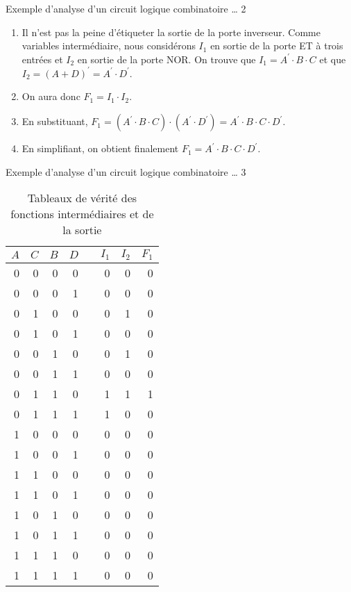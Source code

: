 \documentclass[presentation]{beamer}
\begin{document}
\begin{frame}[label={sec:orgcb3e790}]{Exemple d'analyse d'un circuit logique combinatoire \ldots{} 2}
\begin{enumerate}
\item Il n'est pas la peine d'étiqueter la sortie de la porte
inverseur. Comme variables intermédiaire, nous considérons \(I_1\)
en sortie de la porte ET à trois entrées et \(I_2\) en sortie de la
porte NOR. On trouve que \(I_1 = A^\prime \cdot B \cdot C\) et que
\(I_2 = (A + D)^\prime = A^\prime \cdot D^\prime\).

\item On aura donc \(F_1 = I_1 \cdot I_2\).

\item En substituant, \(F_1 = ( A^\prime \cdot B \cdot C ) \cdot (
   A^\prime \cdot D^\prime) = A^\prime \cdot B \cdot C \cdot
   D^\prime\).

\item En simplifiant, on obtient finalement \(F_1 = A^\prime \cdot B
   \cdot C \cdot D^\prime\).
\end{enumerate}
\end{frame}

\begin{frame}[label={sec:org0cb1112}]{Exemple d'analyse d'un circuit logique combinatoire \ldots{} 3}
\begin{table}[h] \scriptsize
\caption{\label{tab:orge8d8e42}Tableaux de vérité des fonctions intermédiaires et de la sortie}
\centering
\begin{tabular}{rrrrlrrr}
\(A\) & \(C\) & \(B\) & \(D\) &  & \(I_1\) & \(I_2\) & \(F_1\)\\
\hline
0 & 0 & 0 & 0 &  & 0 & 0 & 0\\
0 & 0 & 0 & 1 &  & 0 & 0 & 0\\
0 & 1 & 0 & 0 &  & 0 & 1 & 0\\
0 & 1 & 0 & 1 &  & 0 & 0 & 0\\
0 & 0 & 1 & 0 &  & 0 & 1 & 0\\
0 & 0 & 1 & 1 &  & 0 & 0 & 0\\
0 & 1 & 1 & 0 &  & 1 & 1 & 1\\
0 & 1 & 1 & 1 &  & 1 & 0 & 0\\
1 & 0 & 0 & 0 &  & 0 & 0 & 0\\
1 & 0 & 0 & 1 &  & 0 & 0 & 0\\
1 & 1 & 0 & 0 &  & 0 & 0 & 0\\
1 & 1 & 0 & 1 &  & 0 & 0 & 0\\
1 & 0 & 1 & 0 &  & 0 & 0 & 0\\
1 & 0 & 1 & 1 &  & 0 & 0 & 0\\
1 & 1 & 1 & 0 &  & 0 & 0 & 0\\
1 & 1 & 1 & 1 &  & 0 & 0 & 0\\
\end{tabular}
\end{table}
\end{frame}
\end{document}
